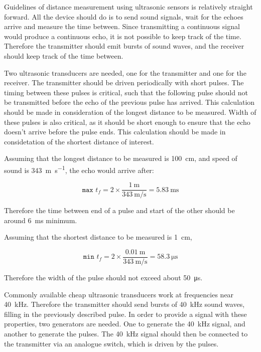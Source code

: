 \documentclass[12pt, a4paper]{article}
\begin{document}
    Guidelines of distance measurement using ultrasonic sensors is relatively straight forward. All the device should do is to send sound signals, wait for the echoes arrive and measure the time between. Since transmitting a continuous signal would produce a continuous echo, it is not possible to keep track of the time. Therefore the transmitter should emit bursts of sound waves, and the receiver should keep track of the time between.

    \bigskip 

    Two ultrasonic transducers are needed, one for the transmitter and one for the receiver. The transmitter should be driven periodically with short pulses. The timing between these pulses is critical, such that the following pulse should not be transmitted before the echo of the previous pulse has arrived. This calculation should be made in consideration of the longest distance to be measured. Width of these pulses is also critical, as it should be short enough to ensure that the echo doesn't arrive before the pulse ends. This calculation should be made in considetation of the shortest distance of interest. 

    Assuming that the longest distance to be measured is \SI{100}{\centi\metre}, and speed of sound is \SI{343}{\metre\per\second}, the echo would arrive after:

    \begin{equation}
        \texttt{max }t_f = 2 \times \frac{\SI{1}{\metre}}{\SI{343}{\metre\per\second}} = \SI{5.83}{\milli\second}
    \end{equation}

    \noindent Therefore the time between end of a pulse and start of the other should be around \SI{6}{\milli\second} minimum. 

    \noindent Assuming that the shortest distance to be measured is \SI{1}{\centi\metre}, 

    \begin{equation}
        \texttt{min }t_f = 2 \times \frac{\SI{0.01}{\metre}}{\SI{343}{\metre\per\second}} = \SI{58.3}{\micro\second}
    \end{equation}

    \noindent Therefore the width of the pulse should not exceed about \SI{50}{\micro\second}.


    \bigskip
    Commonly available cheap ultrasonic transducers work at frequencies near \SI{40}{\kilo\hertz}. Therefore the transmitter should send bursts of \SI{40}{\kilo\hertz} sound waves, filling in the previously described pulse. In order to provide a signal with these properties, two generators are needed. One to generate the \SI{40}{\kilo\hertz} signal, and another to generate the pulses. The \SI{40}{\kilo\hertz} signal should then be connected to the transmitter via an analogue switch, which is driven by the pulses.
\end{document}
